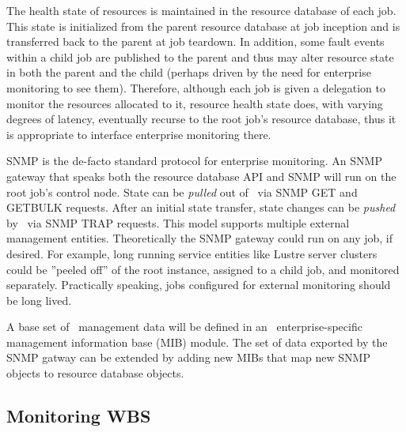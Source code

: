 The health state of resources is maintained in the resource database of
each job.
This state is initialized from the parent resource database at job inception
and is transferred back to the parent at job teardown.
In addition, some fault events within a child job are published
to the parent and thus may alter resource state in both the parent and
the child (perhaps driven by the need for enterprise monitoring to see them).
Therefore, although each job is given a delegation to monitor the resources
allocated to it, resource health state does, with varying degrees of latency,
eventually recurse to the root job's resource database, thus it is
appropriate to interface enterprise monitoring there.

SNMP\cite{StallingsSNMP} is the de-facto standard protocol for enterprise
monitoring.  An SNMP gateway that speaks both the resource database API
and SNMP will run on the root job's control node.
State can be {\em pulled} out of \ngrm\ via SNMP GET and GETBULK requests.
After an initial state transfer, state changes can be {\em pushed}
by \ngrm\ via SNMP TRAP requests.  This model supports multiple external
management entities.
Theoretically the SNMP gateway could run on any job, if desired.
For example, long running service entities like Lustre server clusters
could be ''peeled off'' of the root instance, assigned to a child job,
and monitored separately.
Practically speaking, jobs configured for external monitoring should be
long lived.

A base set of \ngrm\ management data will be defined in an \ngrm\ 
enterprise-specific management information base (MIB) module.
The set of data exported by the SNMP gatway can be extended by adding
new MIBs that map new SNMP objects to resource database objects.

\ifwbs
\subsection{Monitoring WBS}

